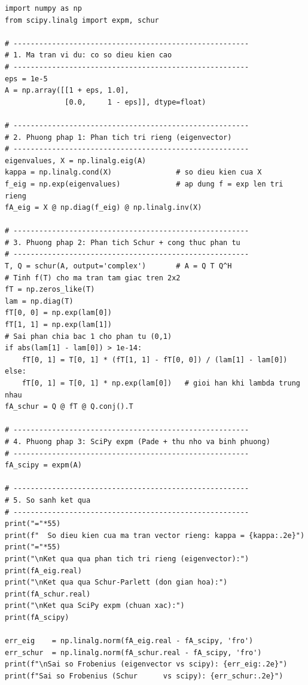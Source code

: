 \documentclass[12pt,a4paper]{report}
\begin{document}
\begin{lstlisting}[style=python, caption={Phương pháp trị riêng: tính $f(A) = e^A$ và so sánh độ chính xác}]
import numpy as np
from scipy.linalg import expm, schur

# -------------------------------------------------------
# 1. Ma tran vi du: co so dieu kien cao
# -------------------------------------------------------
eps = 1e-5
A = np.array([[1 + eps, 1.0],
              [0.0,     1 - eps]], dtype=float)

# -------------------------------------------------------
# 2. Phuong phap 1: Phan tich tri rieng (eigenvector)
# -------------------------------------------------------
eigenvalues, X = np.linalg.eig(A)
kappa = np.linalg.cond(X)               # so dieu kien cua X
f_eig = np.exp(eigenvalues)             # ap dung f = exp len tri rieng
fA_eig = X @ np.diag(f_eig) @ np.linalg.inv(X)

# -------------------------------------------------------
# 3. Phuong phap 2: Phan tich Schur + cong thuc phan tu
# -------------------------------------------------------
T, Q = schur(A, output='complex')       # A = Q T Q^H
# Tinh f(T) cho ma tran tam giac tren 2x2
fT = np.zeros_like(T)
lam = np.diag(T)
fT[0, 0] = np.exp(lam[0])
fT[1, 1] = np.exp(lam[1])
# Sai phan chia bac 1 cho phan tu (0,1)
if abs(lam[1] - lam[0]) > 1e-14:
    fT[0, 1] = T[0, 1] * (fT[1, 1] - fT[0, 0]) / (lam[1] - lam[0])
else:
    fT[0, 1] = T[0, 1] * np.exp(lam[0])   # gioi han khi lambda trung nhau
fA_schur = Q @ fT @ Q.conj().T

# -------------------------------------------------------
# 4. Phuong phap 3: SciPy expm (Pade + thu nho va binh phuong)
# -------------------------------------------------------
fA_scipy = expm(A)

# -------------------------------------------------------
# 5. So sanh ket qua
# -------------------------------------------------------
print("="*55)
print(f"  So dieu kien cua ma tran vector rieng: kappa = {kappa:.2e}")
print("="*55)
print("\nKet qua qua phan tich tri rieng (eigenvector):")
print(fA_eig.real)
print("\nKet qua qua Schur-Parlett (don gian hoa):")
print(fA_schur.real)
print("\nKet qua SciPy expm (chuan xac):")
print(fA_scipy)

err_eig    = np.linalg.norm(fA_eig.real - fA_scipy, 'fro')
err_schur  = np.linalg.norm(fA_schur.real - fA_scipy, 'fro')
print(f"\nSai so Frobenius (eigenvector vs scipy): {err_eig:.2e}")
print(f"Sai so Frobenius (Schur      vs scipy): {err_schur:.2e}")
\end{lstlisting}
\end{document}
